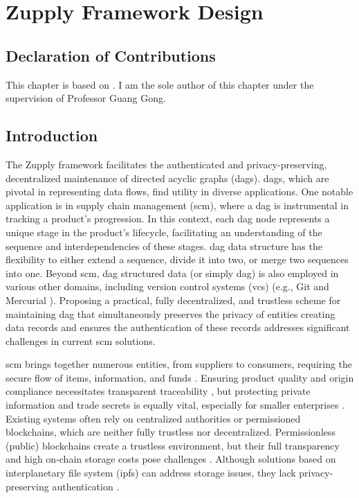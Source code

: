 \chapter{Zupply Framework Design} \label{ch:zupply-design}

\section*{Declaration of Contributions}
This chapter is based on \cite{Badakhshan2024Zupply}. I am the sole author of this chapter under the supervision of Professor Guang Gong.



\section{Introduction}


The Zupply framework facilitates the authenticated and privacy-preserving, decentralized maintenance of directed acyclic graphs (\gls{dag}s). \gls{dag}s, which are pivotal in representing data flows, find utility in diverse applications. One notable application is in supply chain management (\gls{scm}), where a \gls{dag} is instrumental in tracking a product's progression. In this context, each \gls{dag} node represents a unique stage in the product's lifecycle, facilitating an understanding of the sequence and interdependencies of these stages. \gls{dag} data structure has the flexibility to either extend a sequence, divide it into two, or merge two sequences into one. Beyond \gls{scm}, \gls{dag} structured data (or simply \gls{dag}) is also employed in various other domains, including version control systems (\gls{vcs}) (e.g., Git \cite{gitonline2023} and Mercurial \cite{mercurial}). Proposing a practical, fully decentralized, and trustless scheme for maintaining \gls{dag} that simultaneously preserves the privacy of entities creating data records and ensures the authentication of these records addresses significant challenges in current \gls{scm} solutions.

\gls{scm} brings together numerous entities, from suppliers to consumers, requiring the secure flow of items, information, and funds \cite{wisner2021principles}. Ensuring product quality and origin compliance necessitates transparent traceability \cite{SUN2019658}, but protecting private information and trade secrets is equally vital, especially for smaller enterprises \cite{ Winter2023SMEs}. Existing systems often rely on centralized authorities or permissioned blockchains, which are neither fully trustless nor decentralized. Permissionless (public) blockchains create a trustless environment, but their full transparency and high on-chain storage costs pose challenges \cite{ Zhou2022EthereumGraph}. Although solutions based on 
interplanetary file system (\gls{ipfs}) \cite{Benet2014} can address storage issues, they lack privacy-preserving authentication \cite{Khor2023, Musamih2021}. 

